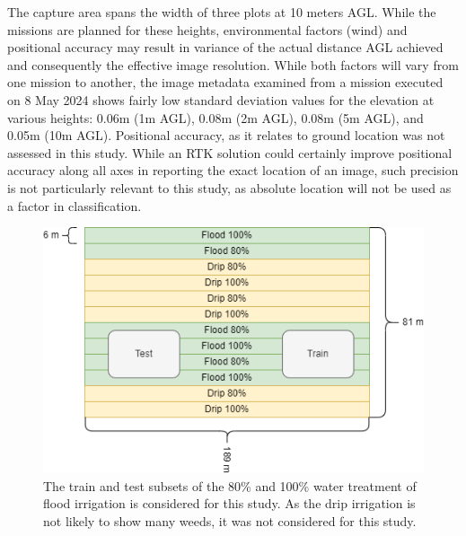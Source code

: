 \documentclass[letterpaper]{report}
\begin{document}
%
The capture area spans the width of three plots at 10 meters AGL. While the missions are planned for these heights, environmental factors (wind) and positional accuracy may result in variance of the actual distance AGL achieved and consequently the effective image resolution. While both factors will vary from one mission to another, the image metadata examined from a mission executed on 8 May 2024 shows fairly low standard deviation values for the elevation  at various heights: 0.06m (1m AGL), 0.08m (2m AGL), 0.08m (5m AGL), and 0.05m (10m AGL). Positional accuracy, as it relates to ground location was not assessed in this study. While an RTK solution could certainly improve positional accuracy along all axes in reporting the exact location of an image, such precision is not particularly relevant to this study, as absolute location will not be used as a factor in classification.

\begin{figure}[h!]
	\centering
	\includegraphics[width=0.8\linewidth]{./figures/test-area.png}
	\caption[Field layout for image acquisition]{The train and test subsets of the 80\% and 100\% water treatment of  flood irrigation is considered for this study. As the drip irrigation is not likely to show many weeds, it was not considered for this study.}
	\label{fig:field-layout}
\end{figure}
\end{document}

